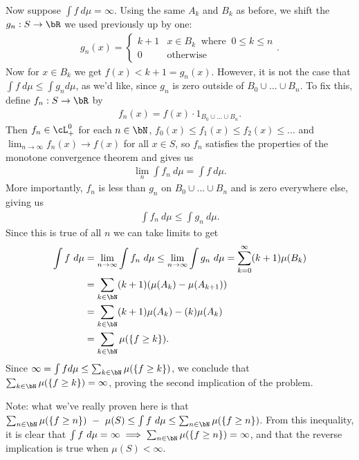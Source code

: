 \begin{homework}[e]
\begin{prf}
		Now suppose $\int f ~d\mu = \infty$. Using the same $A_k$ and $B_k$ as before, we shift the $g_n:S\to \bR$ we used previously up by one:
		\begin{align*}	
			g_n(x) =
			\begin{cases}
				k+1 & x \in B_k ~ \text{ where } ~ 0\leq k\leq n \\
				0 &\text{otherwise}
			\end{cases}.
		\end{align*}
		Now for $x\in B_k$ we get $f(x) < k+1 = g_n(x)$. However, it is not the case that $\int f~d\mu \leq \int g_n d\mu$, as we'd like, since $g_n$ is zero outside of $B_0 \cup...\cup B_n$. To fix this, define $f_n:S\to \bR$ by
		\begin{align*}
			f_n(x) = f(x)\cdot 1_{B_0 \cup...\cup B_n}.
		\end{align*}
		Then $f_n \in \cL^0_+$ for each $n \in \bN$, $f_0(x) \leq f_1(x) \leq f_2(x) \leq ...$ and $\lim_{n\to \infty} f_n(x) \to f(x)$ for all $x \in S$, so $f_n$ satisfies the properties of the monotone convergence theorem and gives us
		\begin{align*}
			\lim_n \int f_n ~d\mu = \int f~d\mu.
		\end{align*}
		More importantly, $f_n$ is less than $g_n$ on $B_0\cup...\cup B_n$ and is zero everywhere else, giving us
		\begin{align*}
			\int f_n ~d\mu \leq \int g_n ~d\mu.
		\end{align*}
		Since this is true of all $n$ we can take limits to get
		\begin{align*}
			\int f~d\mu &= \lim_{n\to \infty} \int f_n ~d\mu \leq \lim_{n\to \infty} \int g_n ~d\mu = \sum_{k = 0}^\infty (k+1) \mu(B_k) \\
						&= \sum_{k \in \bN} (k+1)(\mu(A_k) - \mu(A_{k+1})) \\
						&= \sum_{k\in \bN} (k+1)\mu(A_k) - (k) \mu(A_k) \\
						&= \sum_{k\in \bN} \mu(\{f \geq k\}).
		\end{align*}
		Since $\infty = \int f d\mu \leq \sum_{k\in \bN}\mu(\{f\geq k\})$, we conclude that $\sum_{k \in \bN} \mu(\{f\geq k\}) = \infty$, proving the second implication of the problem.

		\bigskip

		Note: what we've really proven here is that $\sum_{n \in \bN} \mu(\{f\geq n\}) ~-~ \mu(S) \leq \int f ~d\mu \leq \sum_{n \in \bN} \mu(\{f\geq n\})$. From this inequality, it is clear that $\int f ~d\mu = \infty \implies \sum_{n \in \bN} \mu(\{f\geq n\}) = \infty$, and that the reverse implication is true when $\mu(S) < \infty$.
	\end{prf}
\end{homework}

